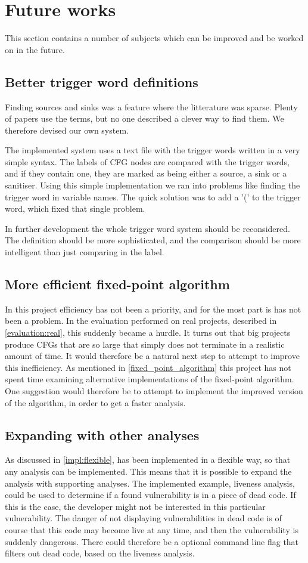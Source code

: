 \section{Future works}
This section contains a number of subjects which can be improved and be worked on in the future.

\subsection{Better trigger word definitions}
Finding sources and sinks was a feature where the litterature was sparse.
Plenty of papers use the terms, but no one described a clever way to find them.
We therefore devised our own system.

The implemented system uses a text file with the trigger words written in a very simple syntax.
The labels of CFG nodes are compared with the trigger words, and if they contain one, they are marked as being either a source, a sink or a sanitiser.
Using this simple implementation we ran into problems like finding the trigger word in variable names.
The quick solution was to add a '(' to the trigger word, which fixed that single problem.

In further development the whole trigger word system should be reconsidered.
The definition should be more sophisticated, and the comparison should be more intelligent than just comparing in the label.

\subsection{More efficient fixed-point algorithm}
In this project efficiency has not been a priority, and for the most part is has not been a problem.
In the evaluation performed on real projects, described in \cref{evaluation:real}, this suddenly became a hurdle.
It turns out that big projects produce CFGs that are so large that \pyt{} simply does not terminate in a realistic amount of time.
It would therefore be a natural next step to attempt to improve this inefficiency.
As mentioned in \cref{fixed_point_algorithm} this project has not spent time examining alternative implementations of the fixed-point algorithm.
One suggestion would therefore be to attempt to implement the improved version of the algorithm, in order to get a faster analysis.

\subsection{Expanding \pyt{} with other analyses}
As discussed in \cref{impl:flexible}, \pyt{} has been implemented in a flexible way, so that any analysis can be implemented.
This means that it is possible to expand the analysis with supporting analyses.
The implemented example, liveness analysis, could be used to determine if a found vulnerability is in a piece of dead code.
If this is the case, the developer might not be interested in this particular vulnerability.
The danger of not displaying vulnerabilities in dead code is of course that this code may become live at any time, and then the vulnerability is suddenly dangerous.
There could therefore be a optional command line flag that filters out dead code, based on the liveness analysis.

